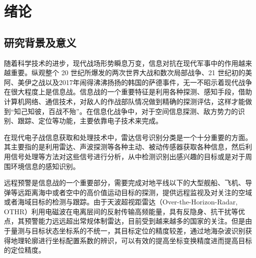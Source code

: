 \chapter{绪论}
\section{研究背景及意义}







随着科学技术的进步，现代战场形势瞬息万变，信息对抗在现代军事中的作用越来越重要。纵观整个 20 世纪所爆发的两次世界大战和数次局部战争、21 世纪初的美阿、美伊之战以及2017年闹得沸沸扬扬的韩国的萨德事件，无一不昭示着现代战争在很大程度上是信息战。信息战的一个重要特征是利用各种探测、感知手段，借助计算机网络、通信技术，对敌人的作战部队情况做到精确的探测评估，这样才能做到“知己知彼，百战不殆”。在信息化战争中，对于空间信息探测、敌方势力的识别、跟踪、定位等功能，主要依靠电子技术来完成\cite{顾耀平2006电子战发展趋势分析, 孙德海2003国外电子战发展综述及对我国电子战研究的思考, 炜森1996综合电子战新技术新方法, 孙纪尧2014电子战}。

在现代电子战信息获取和处理技术中，雷达信号识别分类是一个十分重要的方面。其主要指的是利用雷达、声波探测等各种主动、被动传感器获取各种信息，然后利用信号处理等方法对这些信号进行分析，从中检测识别出感兴趣的目标或是对于周围环境信息的感知识别。

远程预警是信息战的一个重要部分，需要完成对地平线以下的大型舰船、飞机、导弹等远距离海中或者空中的高价值运动目标的探测，提供远程监视及对关注的空域或者海域目标的检测与跟踪。由于天波超视距雷达（Over-the-Horizon-Radar, OTHR）利用电磁波在电离层间的反射传输高频能量，具有反隐身、抗干扰等优点，其预警能力远远超出常规体制雷达，目前受到越来越多的国家的关注。但是由于量测与目标状态坐标系的不统一，其目标定位的精度较差，通过地海杂波识别获得地理轮廓进行坐标配置系数的辨识，可以有效的提高坐标变换精度进而提高目标的定位精度。

